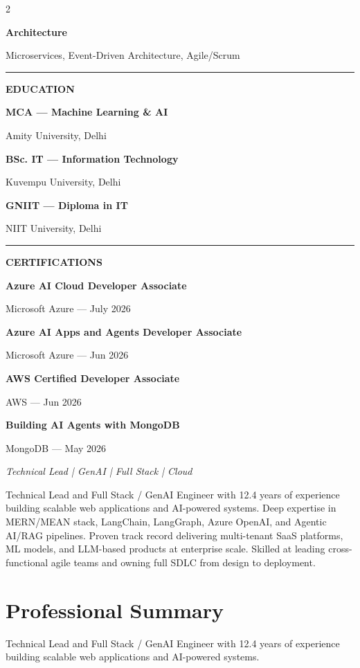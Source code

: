 \documentclass[10pt,a4paper]{article}
\newcommand{\sideheading}[1]{%
  \vspace{5pt}
  {\fontsize{9.5}{11}\bfseries\color{accent}#1}\par
  \vspace{2pt}
}
\newcommand{\sideitem}[2]{%
  {\fontsize{8.3}{10}\bfseries\color{white}#1}\par
  {\fontsize{8}{10}\color{white}#2}\par
  \vspace{3pt}
}
\begin{document}
\begin{paracol}{2}
{\begin{minipage}[t][10.85in][t]{\dimexpr\linewidth-2\fboxsep\relax}
\sideitem{Architecture}{Microservices, Event-Driven Architecture, Agile/Scrum}

\vspace{3pt}
\textcolor{accent}{\rule{\linewidth}{0.5pt}}

\sideheading{EDUCATION}

\sideitem{MCA — Machine Learning \& AI}{Amity University, Delhi}

\sideitem{BSc. IT — Information Technology}{Kuvempu University, Delhi}

\sideitem{GNIIT — Diploma in IT}{NIIT University, Delhi}

\vspace{3pt}
\textcolor{accent}{\rule{\linewidth}{0.5pt}}

\sideheading{CERTIFICATIONS}

\sideitem{Azure AI Cloud Developer Associate}{Microsoft Azure — July 2026}

\sideitem{Azure AI Apps and Agents Developer Associate}{Microsoft Azure — Jun 2026}

\sideitem{AWS Certified Developer Associate}{AWS — Jun 2026}

\sideitem{Building AI Agents with MongoDB}{MongoDB — May 2026}

\vfill

{\fontsize{7.2}{9}\itshape\color{white}
Technical Lead | GenAI | Full Stack | Cloud}\par

\vspace{10pt}
\end{minipage}
}

\switchcolumn


{\fontsize{8.8}{12}\color{textmain}
Technical Lead and Full Stack / GenAI Engineer with 12.4 years of experience building scalable
web applications and AI-powered systems. Deep expertise in MERN/MEAN stack, LangChain,
LangGraph, Azure OpenAI, and Agentic AI/RAG pipelines. Proven track record delivering
multi-tenant SaaS platforms, ML models, and LLM-based products at enterprise scale. Skilled
at leading cross-functional agile teams and owning full SDLC from design to deployment.
}

\section{Professional Summary}
{\fontsize{0.1}{0.1}\color{white}
Technical Lead and Full Stack / GenAI Engineer with 12.4 years of experience building scalable web applications and AI-powered systems.
}


\end{paracol}
\end{document}
